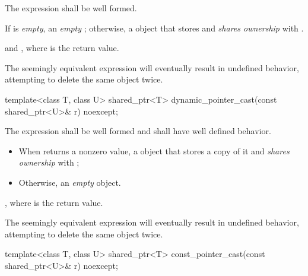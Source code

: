 \begin{itemdescr}
\pnum\requires  The expression  shall
be well formed.

\pnum\returns  If  is \textit{empty}, an \textit{empty}
; otherwise, a  object that
stores  and \textit{shares ownership}
with .

\pnum
\postconditions {} and
, where  is the return value.

\pnum
\begin{note} The seemingly equivalent expression
will eventually result in undefined behavior, attempting to delete the
same object twice. \end{note}
\end{itemdescr}

%
\begin{itemdecl}
template<class T, class U> shared_ptr<T> dynamic_pointer_cast(const shared_ptr<U>& r) noexcept;
\end{itemdecl}

\begin{itemdescr}
\pnum\requires  The expression 
shall be well formed and shall have well defined behavior.

\pnum\returns
\begin{itemize}
\item When  returns a nonzero value, a
   object that stores a copy of it and \textit{shares
  ownership} with ;

\item Otherwise, an \textit{empty}  object.
\end{itemize}

\pnum
\postcondition {}, where  is the return value.

\pnum \begin{note}  The seemingly equivalent expression
 will eventually result in
undefined behavior, attempting to delete the same object twice. \end{note}
\end{itemdescr}

%
\begin{itemdecl}
template<class T, class U> shared_ptr<T> const_pointer_cast(const shared_ptr<U>& r) noexcept;
\end{itemdecl}

